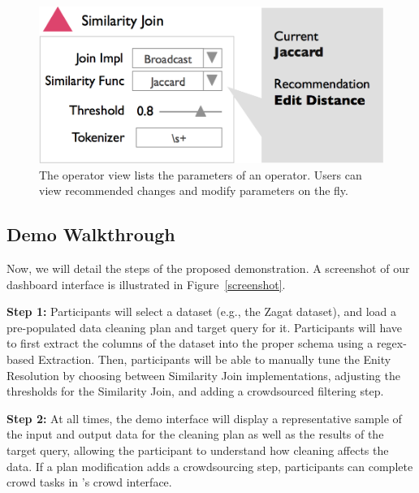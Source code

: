 \begin{figure}[t]
\centering
 \includegraphics[width=\columnwidth]{figs/dashboard_recsys.png}
 \caption{The operator view lists the parameters of an operator. Users can view recommended changes and modify parameters on the fly.}
 \label{screenshot-rec}\vspace{-1.75em}
\end{figure}

\subsection{Demo Walkthrough}
Now, we will detail the steps of the proposed demonstration.
A screenshot of our dashboard interface is illustrated in Figure~\ref{screenshot}.

\vspace{0.2em}

\noindent\textbf{Step 1: } Participants will select a dataset (e.g., the Zagat dataset), and load a pre-populated data cleaning plan and target query for it.
Participants will have to first extract the columns of the dataset into the proper schema using a regex-based Extraction.
Then, participants will be able to manually tune the Enity Resolution by choosing between Similarity Join implementations, adjusting the thresholds for the Similarity Join, and adding a crowdsourced filtering step.

\vspace{0.2em}

\noindent\textbf{Step 2: } At all times, the demo interface will display a representative sample of the input and output data for the cleaning plan as well as the results of the target query, allowing the participant to understand how cleaning affects the data. 
If a plan modification adds a crowdsourcing step, participants can complete crowd tasks in \sys's crowd interface.

\vspace{0.2em}

